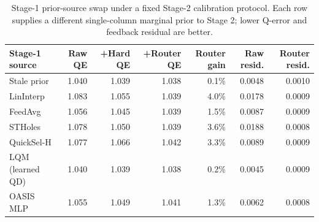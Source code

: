 \begin{table}[t]
  \centering
  \small
  \caption{Stage-1 prior-source swap under a fixed Stage-2 calibration protocol. Each row supplies a different single-column marginal prior to Stage 2; lower Q-error and feedback residual are better.}
  \label{tab:stage1_estimator_swap}
  \setlength{\tabcolsep}{4pt}
  \begin{tabular}{lrrrrrr}
    \toprule
    Stage-1 source & Raw QE & +Hard QE & +Router QE & Router gain & Raw resid. & Router resid. \\
    \midrule
    Stale prior & 1.040 & 1.039 & 1.038 & 0.1\% & 0.0048 & 0.0010 \\
    LinInterp & 1.083 & 1.055 & 1.039 & 4.0\% & 0.0178 & 0.0009 \\
    FeedAvg & 1.056 & 1.045 & 1.039 & 1.5\% & 0.0087 & 0.0009 \\
    STHoles & 1.078 & 1.050 & 1.039 & 3.6\% & 0.0188 & 0.0008 \\
    QuickSel-H & 1.077 & 1.066 & 1.042 & 3.3\% & 0.0089 & 0.0009 \\
    LQM (learned QD) & 1.040 & 1.039 & 1.038 & 0.2\% & 0.0045 & 0.0009 \\
    OASIS MLP & 1.055 & 1.049 & 1.041 & 1.3\% & 0.0062 & 0.0008 \\
    \bottomrule
  \end{tabular}
\end{table}
